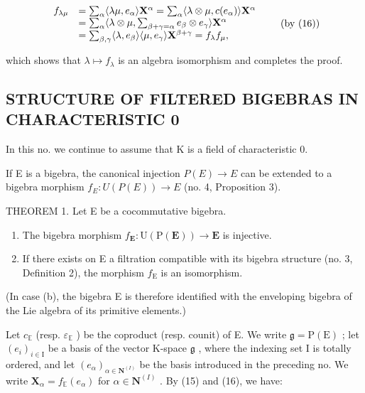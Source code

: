 \[
\begin{array}{r l} f _ {\lambda \mu} & = \sum_ {\alpha} \langle \lambda \mu , e _ {\alpha} \rangle \mathbf {X} ^ {\alpha} = \sum_ {\alpha} \langle \lambda \otimes \mu , c (e _ {\alpha}) \rangle \mathbf {X} ^ {\alpha} \\ & = \sum_ {\alpha} \langle \lambda \otimes \mu , \sum_ {\beta + \gamma = \alpha} e _ {\beta} \otimes e _ {\gamma} \rangle \mathbf {X} ^ {\alpha} \\ & = \sum_ {\beta , \gamma} \langle \lambda , e _ {\beta} \rangle \langle \mu , e _ {\gamma} \rangle \mathbf {X} ^ {\beta + \gamma} = f _ {\lambda} f _ {\mu}, \end{array}\tag{by (16)}
\]

which shows that \(\lambda \mapsto f_{\lambda}\) is an algebra isomorphism and completes the proof.

\subsection{STRUCTURE OF FILTERED BIGEBRAS IN CHARACTERISTIC 0}

In this no. we continue to assume that K is a field of characteristic 0.

If E is a bigebra, the canonical injection \(P(E) \rightarrow E\) can be extended to a bigebra morphism \(f_{E}: U(P(E)) \rightarrow E\) (no. 4, Proposition 3).

THEOREM 1. Let E be a cocommutative bigebra.

\begin{enumerate}
\def\labelenumi{(\alph{enumi})}
\item
  The bigebra morphism \(f_{\mathbf{E}} \colon \mathrm{U}(\mathrm{P}(\mathbf{E})) \to \mathbf{E}\) is injective.
\item
  If there exists on E a filtration compatible with its bigebra structure (no. 3, Definition 2), the morphism \(f_{\mathrm{E}}\) is an isomorphism.
\end{enumerate}

(In case (b), the bigebra E is therefore identified with the enveloping bigebra of the Lie algebra of its primitive elements.)

Let \(c_{\mathbb{E}}\) (resp. \(\varepsilon_{\mathbb{E}}\) ) be the coproduct (resp. counit) of E. We write \(\mathfrak{g} = \mathrm{P}(\mathrm{E})\) ; let \((e_i)_{i \in \mathrm{I}}\) be a basis of the vector K-space \(\mathfrak{g}\) , where the indexing set I is totally ordered, and let \((e_\alpha)_{\alpha \in \mathbf{N}^{(I)}}\) be the basis introduced in the preceding no. We write \(\mathbf{X}_\alpha = f_{\mathbb{E}}(e_\alpha)\) for \(\alpha \in \mathbf{N}^{(I)}\) . By (15) and (16), we have:

